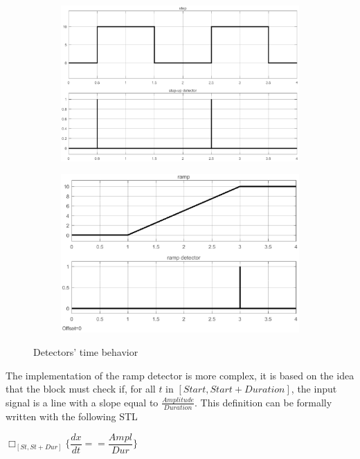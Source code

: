 \begin{figure}[h]
\centering
\begin{subfigure}[b]{.48\textwidth}
\centering
\includegraphics[width=\textwidth]{Figs/stepdetsim.eps}
\end{subfigure}
\begin{subfigure}[b]{.48\textwidth}
\centering
\includegraphics[width=\textwidth]{Figs/rampdetsim.eps}
\end{subfigure}
\caption{Detectors' time behavior}
\label{fig:detbehavior}
\end{figure}
The implementation of the ramp detector is more complex, it is based on the idea that the block must check if, for all $t$ in $[Start, Start+Duration]$, the input signal is a line with a slope equal to $\frac{Amplitude}{Duration}$. This definition can be formally written with the following STL

\begin{center}
$\Box_{[St, St+Dur]}\Bigg\{\dfrac{dx}{dt}==\dfrac{Ampl}{Dur} \Bigg\}$
\end{center}

